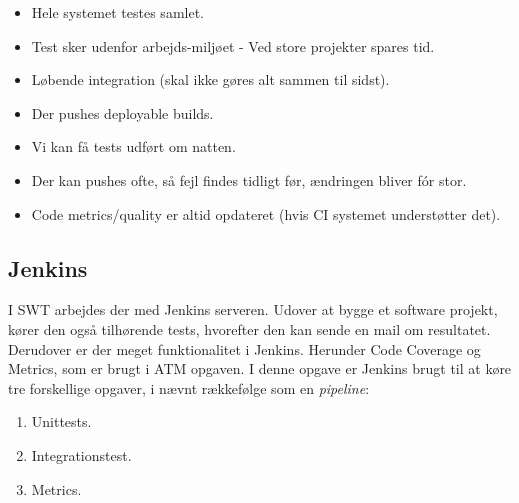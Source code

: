 \begin{itemize}
	\item Hele systemet testes samlet.
	\item Test sker udenfor arbejds-miljøet - Ved store projekter spares tid.
	\item Løbende integration (skal ikke gøres alt sammen til sidst).
	\item Der pushes deployable builds.
	\item Vi kan få tests udført om natten.
	\item Der kan pushes ofte, så fejl findes tidligt før, ændringen bliver fór stor.
	\item Code metrics/quality er altid opdateret (hvis CI systemet understøtter det).
\end{itemize}

\subsection{Jenkins}
I SWT arbejdes der med Jenkins serveren. Udover at bygge et software projekt, kører den også tilhørende tests, hvorefter den kan sende en mail om resultatet.\\

Derudover er der meget funktionalitet i Jenkins. Herunder Code Coverage og Metrics, som er brugt i ATM opgaven. I denne opgave er Jenkins brugt til at køre tre forskellige opgaver, i nævnt rækkefølge som en \textit{pipeline}: 

\begin{enumerate}
	\item Unittests.
	\item Integrationstest.
	\item Metrics.
\end{enumerate}
